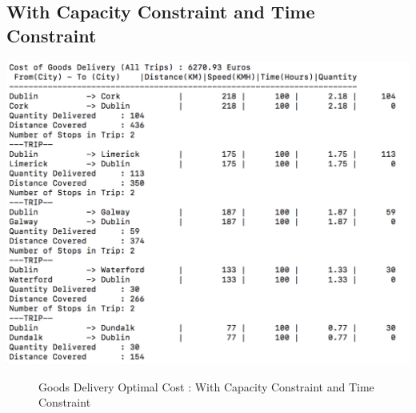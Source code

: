 \documentclass[a4paper&11pt]{article}
\begin{document}
\subsection*{With Capacity Constraint and Time Constraint}

\begin{center}
\includegraphics[scale=0.8]{30fig4.png}
\begin{figure}[H]
\caption{Goods Delivery Optimal Cost :  With Capacity Constraint  and Time Constraint}
\label{fig:30fig4}
\end{figure}
\end{center}
\end{document}
